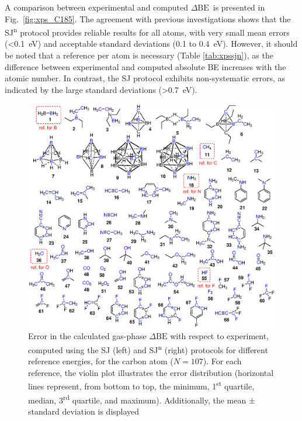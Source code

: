 \documentclass[journal=jpccck,manuscript=article]{achemso}
\def\dbe{\ensuremath{\Delta\text{BE}}}
\begin{document}
A comparison between experimental and computed \dbe\ is presented in Fig.~\ref{fig:xps_C185}. The agreement with previous investigations \cite{pueyobellafontPredictingCoreLevel2017,golzeAccurateAbsoluteRelative2020} shows that the SJ\textsuperscript{n} protocol provides reliable results for all atoms, with very small mean errors (<\SI{0.1}{\electronvolt}) and acceptable standard deviations (0.1 to \SI{0.4}{\electronvolt}). However, it should be noted that a reference per atom is necessary (Table \ref{tab:xpssjn}), as the difference between experimental and computed absolute BE increases with the atomic number. 
In contrast, the SJ protocol exhibits non-systematic errors, as indicated by the large standard deviations (>\SI{0.7}{\electronvolt}).

\begin{figure}[!h]
	\centering
	\includegraphics[width=\linewidth]{Figure3}
	\caption{Error in the calculated gas-phase \dbe{} with respect to experiment, computed using the SJ (left) and SJ\textsuperscript{n} (right) protocols for different reference energies, for the carbon atom ($N=107$). For each reference, the violin plot illustrates the error distribution (horizontal lines represent, from bottom to top, the minimum, 1\textsuperscript{st} quartile, median, 3\textsuperscript{rd} quartile, and maximum). Additionally, the mean $\pm$ standard deviation is displayed}
	\label{fig:xps_C185_C}
\end{figure}
\end{document}
